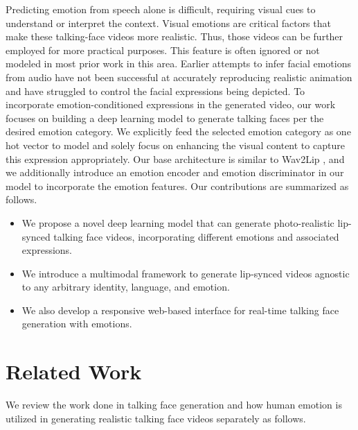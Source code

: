 \documentclass[accepted]{uai2023}
\begin{document}
Predicting emotion from speech alone is difficult, requiring visual cues to understand or interpret the context. Visual emotions are critical factors that make these talking-face videos more realistic. Thus, those videos can be further employed for more practical purposes. This feature is often ignored or not modeled in most prior work in this area.
Earlier attempts \citep{DBLP:journals/corr/abs-1906-06337, https://doi.org/10.48550/arxiv.2007.08547} to infer facial emotions from audio have not been successful at accurately reproducing realistic animation and have struggled to control the facial expressions being depicted.
To incorporate emotion-conditioned expressions in the generated video, our work focuses on building a deep learning model to generate talking faces per the desired emotion category. We explicitly feed the selected emotion category as one hot vector to model and solely focus on enhancing the visual content to capture this expression appropriately. Our base architecture is similar to Wav2Lip \citep{prajwal2020lip}, and we additionally introduce an emotion encoder and emotion discriminator in our model to incorporate the emotion features. Our contributions are summarized as follows.
\begin{itemize}
    \item We propose a novel deep learning model that can generate photo-realistic lip-synced talking face videos, incorporating different emotions and associated expressions.
    \item We introduce a multimodal framework to generate lip-synced videos agnostic to any arbitrary identity, language, and emotion.
    \item We also develop a responsive web-based interface for real-time talking face generation with emotions.
\end{itemize}

\section{Related Work}
We review the work done in talking face generation and how human emotion is utilized in generating realistic talking face videos separately as follows.
\end{document}
